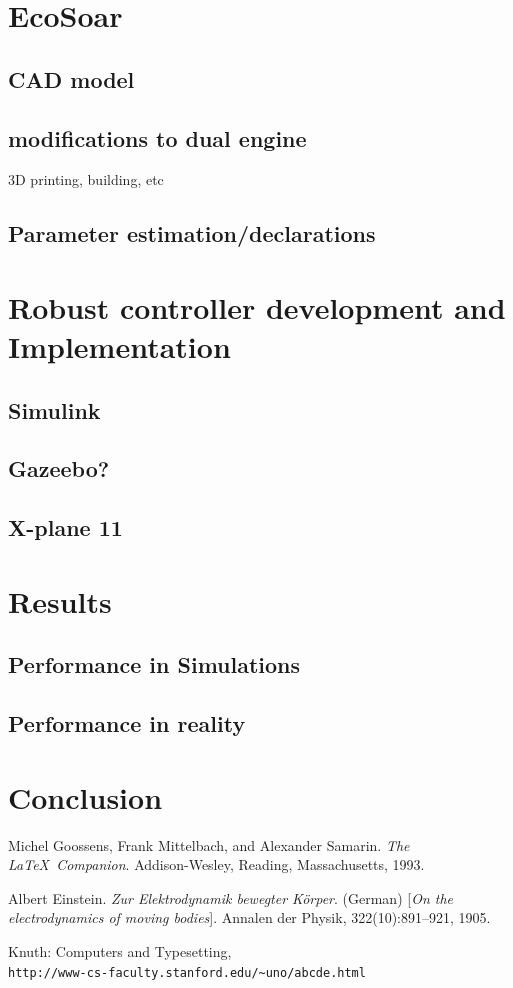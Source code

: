\documentclass{article}
\begin{document}
\section{EcoSoar}
\subsection{CAD model}
\subsection{modifications to dual engine}
3D printing, building, etc
\subsection{Parameter estimation/declarations}

\section{\textbf{Robust controller development and Implementation}}
\subsection{Simulink}
\subsection{Gazeebo?}
\subsection{X-plane 11}


\section{Results}
\subsection{Performance in Simulations}
\subsection{Performance in reality}

\section{Conclusion}

\begin{thebibliography}{9}
Michel Goossens, Frank Mittelbach, and Alexander Samarin. 
\textit{The \LaTeX\ Companion}. 
Addison-Wesley, Reading, Massachusetts, 1993.
 
Albert Einstein. 
\textit{Zur Elektrodynamik bewegter K{\"o}rper}. (German) 
[\textit{On the electrodynamics of moving bodies}]. 
Annalen der Physik, 322(10):891–921, 1905.
 
Knuth: Computers and Typesetting,
\\\texttt{http://www-cs-faculty.stanford.edu/\~{}uno/abcde.html}
\end{thebibliography}
\end{document}
